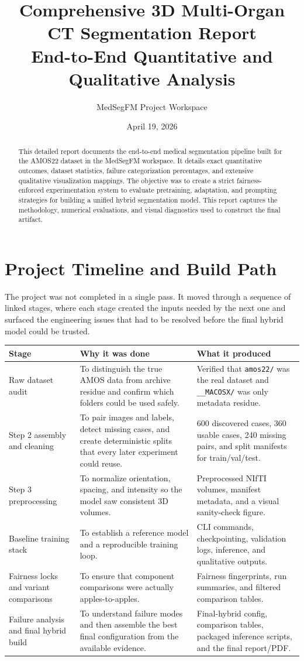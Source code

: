 \documentclass[11pt,a4paper]{article}
\title{Comprehensive 3D Multi-Organ CT Segmentation Report\\End-to-End Quantitative and Qualitative Analysis}
\author{MedSegFM Project Workspace}
\date{April 19, 2026}
\begin{document}
\maketitle

\begin{abstract}
This detailed report documents the end-to-end medical segmentation pipeline built for the AMOS22 dataset in the MedSegFM workspace. It details exact quantitative outcomes, dataset statistics, failure categorization percentages, and extensive qualitative visualization mappings. The objective was to create a strict fairness-enforced experimentation system to evaluate pretraining, adaptation, and prompting strategies for building a unified hybrid segmentation model. This report captures the methodology, numerical evaluations, and visual diagnostics used to construct the final artifact.
\end{abstract}

\section{Project Timeline and Build Path}
The project was not completed in a single pass. It moved through a sequence of linked stages, where each stage created the inputs needed by the next one and surfaced the engineering issues that had to be resolved before the final hybrid model could be trusted.

\begin{longtable}{p{}p{}p{}}
\toprule
Stage & Why it was done & What it produced \\
\midrule
Raw dataset audit & To distinguish the true AMOS data from archive residue and confirm which folders could be used safely. & Verified that \texttt{amos22/} was the real dataset and \texttt{\_\_MACOSX/} was only metadata residue. \\
Step 2 assembly and cleaning & To pair images and labels, detect missing cases, and create deterministic splits that every later experiment could reuse. & 600 discovered cases, 360 usable cases, 240 missing pairs, and split manifests for train/val/test. \\
Step 3 preprocessing & To normalize orientation, spacing, and intensity so the model saw consistent 3D volumes. & Preprocessed NIfTI volumes, manifest metadata, and a visual sanity-check figure. \\
Baseline training stack & To establish a reference model and a reproducible training loop. & CLI commands, checkpointing, validation logs, inference, and qualitative outputs. \\
Fairness locks and variant comparisons & To ensure that component comparisons were actually apples-to-apples. & Fairness fingerprints, run summaries, and filtered comparison tables. \\
Failure analysis and final hybrid build & To understand failure modes and then assemble the best final configuration from the available evidence. & Final-hybrid config, comparison tables, packaged inference scripts, and the final report/PDF. \\
\bottomrule
\end{longtable}
\end{document}
